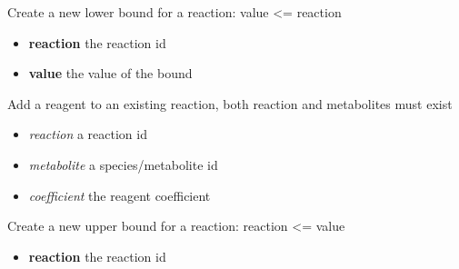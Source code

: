 \documentclass[a4paper,11pt,english]{sphinxmanual}
\begin{document}
\begin{fulllineitems}
\begin{fulllineitems}
\end{fulllineitems}


\begin{fulllineitems}
\label{modules_doc:cbmpy.CBModel.Model.createReactionLowerBound}
Create a new lower bound for a reaction: value \textless{}= reaction
\begin{itemize}
\item {} 
\textbf{reaction} the reaction id

\item {} 
\textbf{value} the value of the bound

\end{itemize}

\end{fulllineitems}


\begin{fulllineitems}
\label{modules_doc:cbmpy.CBModel.Model.createReactionReagent}
Add a reagent to an existing reaction, both reaction and metabolites must exist
\begin{itemize}
\item {} 
\emph{reaction} a reaction id

\item {} 
\emph{metabolite} a species/metabolite id

\item {} 
\emph{coefficient} the reagent coefficient

\end{itemize}

\end{fulllineitems}


\begin{fulllineitems}
\label{modules_doc:cbmpy.CBModel.Model.createReactionUpperBound}
Create a new upper bound for a reaction: reaction \textless{}= value
\begin{itemize}
\item {} 
\textbf{reaction} the reaction id


\end{itemize}
\end{fulllineitems}
\end{fulllineitems}
\end{document}
